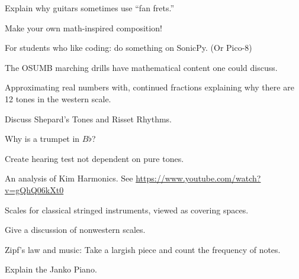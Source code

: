 \documentclass[12pt,noauthor,nooutcomes]{ximera}%
\begin{document}
\begin{project}
Explain why guitars sometimes use ``fan frets.''
\end{project}


\begin{project}
Make your own math-inspired composition!
\end{project}


\begin{project}
For students who like coding: do something on SonicPy.  (Or Pico-8)
\end{project}


\begin{project}
The OSUMB marching drills have mathematical content one could discuss.
\end{project}


\begin{project}
Approximating real numbers with, continued fractions explaining why there are 12 tones in the western scale. 
\end{project}


\begin{project}
Discuss Shepard's Tones and Risset Rhythms. 
\end{project}


\begin{project}
Why is a trumpet in $B\flat$?
\end{project}


\begin{project}
Create hearing test not dependent on pure tones.
\end{project}


\begin{project}
An analysis of Kim Harmonics. See \url{https://www.youtube.com/watch?v=gQhQ06kXt0}
\end{project}


\begin{project}
Scales for classical stringed instruments, viewed as covering spaces.
\end{project}


\begin{project}
Give a discussion of nonwestern scales.
\end{project}


\begin{project}
Zipf's law and music: Take a largish piece and count the frequency of notes. 
\end{project}


\begin{project}
Explain the Janko Piano.
\end{project}
\end{document}
